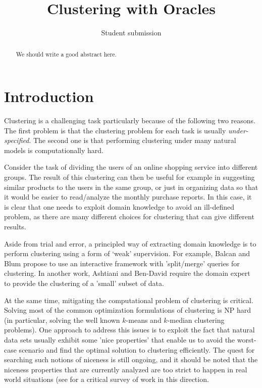 \documentclass[orivec]{llncs}
\title{Clustering with Oracles}
\author{Student submission}
\begin{document}
\maketitle

\begin{abstract}
We should write a good abstract here.
\end{abstract}

\section{Introduction}

Clustering is a challenging task particularly because of the following two reasons. The first problem is that the clustering problem for each task is usually \emph{under-specified}. The second one is that performing clustering under many natural models is computationally hard.

Consider the task of dividing the users of an online shopping service into different groups. The result of this clustering can then be useful for example in suggesting similar products to the users in the same group, or just in organizing data so that it would be easier to read/analyze the monthly purchase reports. In this case, it is clear that one needs to exploit domain knowledge to avoid an ill-defined problem, as there are many different choices for clustering that can give different results. 

Aside from trial and error, a principled way of extracting domain knowledge is to perform clustering using a form of `weak' supervision.  For example, Balcan and Blum \cite{balcan2008clustering} propose to use an interactive framework with 'split/merge' queries for clustering. In another work, Ashtiani and Ben-David \cite{ashtiani2015representation} require the domain expert to provide the clustering of a 'small' subset of data.

At the same time, mitigating the computational problem of clustering is critical. Solving most of the common optimization formulations of clustering is NP hard (in particular, solving the well known $k$-means and $k$-median clustering problems). One approach to address this issues is to exploit the fact that natural data sets usually exhibit some 'nice properties' that enable us to avoid the worst-case scenario and find the optimal solution to clustering efficiently. The quest for searching such notions of niceness is still ongoing, and it should be noted that the niceness properties that are currently analyzed are too strict to happen in real world situations (see \cite{Ben-David15} for a critical survey of work in this direction.
\end{document}

